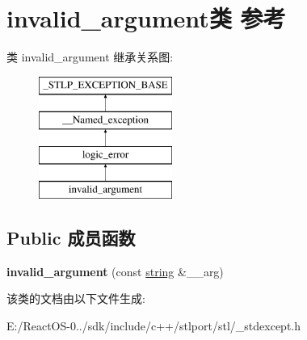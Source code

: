 \hypertarget{classinvalid__argument}{}\section{invalid\+\_\+argument类 参考}
\label{classinvalid__argument}
类 invalid\+\_\+argument 继承关系图\+:\begin{figure}[H]
\begin{center}
\leavevmode
\includegraphics[height=4.000000cm]{classinvalid__argument}
\end{center}
\end{figure}
\subsection*{Public 成员函数}
\begin{DoxyCompactItemize}
\item 
\mbox{\label{classinvalid__argument_a75e2218aa04b2f4dabff1128f3756e6e}} 
{\bfseries invalid\+\_\+argument} (const \hyperlink{structstring}{string} \&\+\_\+\+\_\+arg)
\end{DoxyCompactItemize}


该类的文档由以下文件生成\+:\begin{DoxyCompactItemize}
\item 
E\+:/\+React\+O\+S-\/0../sdk/include/c++/stlport/stl/\+\_\+stdexcept.\+h\end{DoxyCompactItemize}
